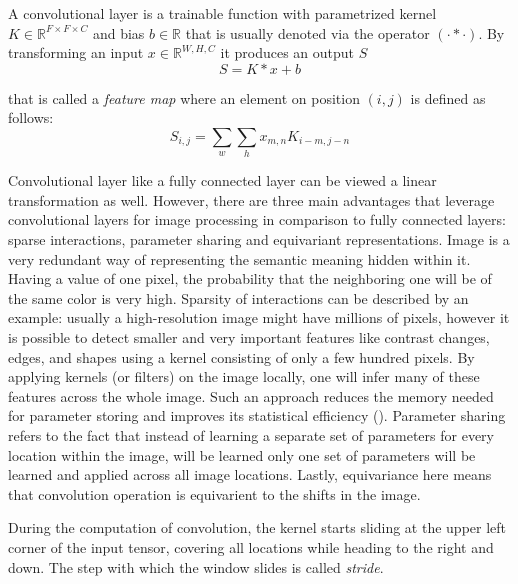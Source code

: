 \begin{definition}
	A convolutional layer is a trainable function with parametrized kernel $K \in \mathbb{R}^{F \times F \times C}$ and bias $b \in \mathbb{R}$ that is usually denoted via the operator $(\cdot * \cdot)$. By transforming an input $x \in \mathbb{R}^{W, H, C}$ it produces an output $S$
	\begin{equation}
		S = K * x + b
	\end{equation}

	that is called a \textit{feature map} where an element on position $(i, j)$ is defined as follows:
		\begin{equation}
			S_{i, j} = \sum_{w} \sum_{h} x_{m, n}  K_{i - m, j - n}
		\end{equation}
\end{definition}

Convolutional layer like a fully connected layer can be viewed a linear transformation as well. However, there are three main advantages that leverage convolutional layers for image processing in comparison to fully connected layers: sparse interactions, parameter sharing and equivariant representations. Image is a very redundant way of representing the semantic meaning hidden within it. Having a value of one pixel, the probability that the neighboring one will be of the same color is very high. Sparsity of interactions can be described by an example: usually a high-resolution image might have millions of pixels, however it is possible to detect smaller and very important features like contrast changes, edges, and shapes using a kernel consisting of only a few hundred pixels. By applying kernels (or filters) on the image locally, one will infer many of these features across the whole image. Such an approach reduces the memory needed for parameter storing and improves its statistical eﬃciency (\cite{Goodfellow_2016}). Parameter sharing refers to the fact that instead of learning a separate set of parameters for every location within the image, will be learned only one set of parameters will be learned and applied across all image locations. Lastly, equivariance here means that convolution operation is equivarient to the shifts in the image.

\begin{definition}[Stride]
	During the computation of convolution, the kernel starts sliding at the upper left corner of the input tensor, covering all locations while heading to the right and down. The step with which the window slides is called \textit{stride}. 
\end{definition}

